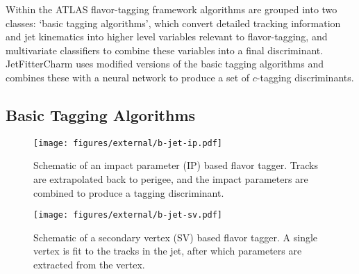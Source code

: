 Within the ATLAS flavor-tagging framework algorithms are grouped into two classes: `basic tagging algorithms', which convert detailed tracking information and jet kinematics into higher level variables relevant to flavor-tagging, and multivariate classifiers to combine these variables into a final discriminant.  JetFitterCharm uses modified versions of the basic tagging algorithms and combines these with a neural network to produce a set of $c$-tagging discriminants.


\subsection{Basic Tagging Algorithms}

\newcommand{\jfsignote}{The total significance of JetFitter vertices is computed as $S_{d}^{\rm JF} = (\sum_i L_{i} / \sigma^2_i )\big/(\sum_i 1 / \sigma^2_i)^{1/2}$,
where $i$ indexes the tracks, $L$ is the vertex displacement, and $\sigma$ is the vertex displacement uncertainty.}

\begin{figure}
  \begin{center}
  \texttt{[image: figures/external/b-jet-ip.pdf]}
  \caption[Impact parameter based flavor-tagging]{Schematic of an impact parameter (IP) based flavor tagger. Tracks are extrapolated back to perigee, and the impact parameters are combined to produce a tagging discriminant.}
  \label{fig:b-jet-ip}
  \end{center}
\end{figure}

\begin{figure}
  \begin{center}
  \texttt{[image: figures/external/b-jet-sv.pdf]}
  \caption[Secondary vertex based flavor-tagging]{Schematic of a secondary vertex (SV) based flavor tagger. A single vertex is fit to the tracks in the jet, after which parameters are extracted from the vertex.}
  \label{fig:b-jet-sv}
  \end{center}
\end{figure}

